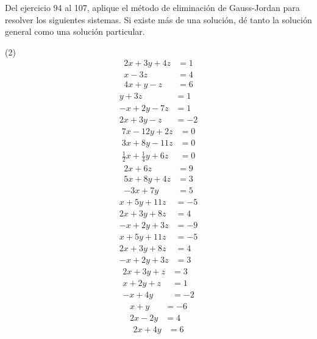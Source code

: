 Del ejercicio 94 al 107, aplique el método de eliminación de Gauss-Jordan para resolver los siguientes sistemas. Si existe más de una solución, dé tanto la solución general como una solución particular.\label{EJERCICIOSDECRAMER}
\begin{tasks}[
    start=94,
    style=enumerate,
    label-offset = 3mm,
    ](2)
    \task
    \begin{align*}
    2x+3y+4z &= 1 \\
    x-3z &= 4 \\
    4x+y-z &= 6
    \end{align*}
    \task
    \begin{align*}
    y+3z &= 1 \\
    -x+2y-7z &= 1 \\
    2x+3y-z &= -2
    \end{align*}
    \task
    \begin{align*}
    7x-12y+2z &= 0 \\
    3x+8y-11z &= 0 \\
    \frac{1}{2}x +\frac{1}{4}y+6z &= 0
    \end{align*}
    \task
    \begin{align*}
    2x+6z &= 9 \\
    5x+8y+4z &= 3 \\
    -3x+7y &= 5
    \end{align*}
    \task
    \begin{align*}
    x+5y+11z &= -5 \\
    2x+3y+8z &= 4 \\
    -x+2y+3z &= -9
    \end{align*}
    \task
    \begin{align*}
    x+5y+11z &= -5 \\
    2x+3y+8z &= 4 \\
    -x+2y+3z &= 3
    \end{align*}
    \task
    \begin{align*}
    2x+3y+z &= 3 \\
    x+2y+z &= 1 \\
    -x+4y &= -2
    \end{align*}
    \task
    \begin{align*}
    x+y &= -6 \\
    2x-2y &= 4
    \end{align*}
    \task
    \begin{align*}
    2x+4y &= 6 \\

\end{align*}
\end{tasks}
